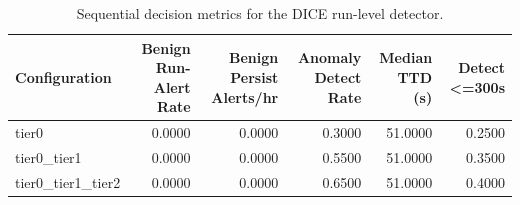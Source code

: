 \begin{table}[t]
\centering
\caption{Sequential decision metrics for the DICE run-level detector.}
\label{tab:dice_sequential_metrics}
\footnotesize
\begin{tabular}{lrrrrr}
\toprule
Configuration & Benign Run-Alert Rate & Benign Persist Alerts/hr & Anomaly Detect Rate & Median TTD (s) & Detect <=300s \\
\midrule
tier0 & 0.0000 & 0.0000 & 0.3000 & 51.0000 & 0.2500 \\
tier0_tier1 & 0.0000 & 0.0000 & 0.5500 & 51.0000 & 0.3500 \\
tier0_tier1_tier2 & 0.0000 & 0.0000 & 0.6500 & 51.0000 & 0.4000 \\
\bottomrule
\end{tabular}

\end{table}
